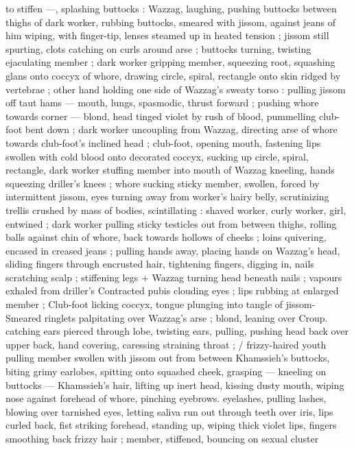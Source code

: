 to stiffen ---, splashing buttocks : Wazzag, laughing, pushing 
buttocks between thighs of dark worker, rubbing buttocks, smeared 
with jissom, against jeans of him wiping, with finger-tip, lenses 
steamed up in heated tension ; jissom still spurting, clots catching on 
curls around arse ; buttocks turning, twisting ejaculating member ; 
dark worker gripping member, squeezing root, squashing glans onto 
coccyx of whore, drawing circle, spiral, rectangle onto skin ridged by 
vertebrae ; other hand holding one side of Wazzag's sweaty torso : 
pulling jissom off taut hams --- mouth, lungs, spasmodic, thrust 
forward ; pushing whore towards corner --- blond, head tinged violet 
by rush of blood, pummelling club-foot bent down ; dark worker 
uncoupling from Wazzag, directing arse of whore towards club-foot's 
inclined head ; club-foot, opening mouth, fastening lips swollen with 
cold blood onto decorated coccyx, sucking up circle, spiral, 
rectangle, dark worker stuffing member into mouth of Wazzag 
kneeling, hands squeezing driller's knees ; whore sucking sticky 
member, swollen, forced by intermittent jissom, eyes turning away 
from worker's hairy belly, scrutinizing trellis crushed by mass of 
bodies, scintillating : shaved worker, curly worker, girl, entwined ; 
dark worker pulling sticky testicles out from between thighs, rolling 
balls against chin of whore, back towards hollows of cheeks ; loins 
quivering, encased in creased jeans ; pulling hands away, placing 
hands on Wazzag's head, sliding fingers through encrusted hair, 
tightening fingers, digging in, nails scratching scalp ; stiffening legs 
+ Wazzag turning head beneath nails ; vapours exhaled from driller's 
Contracted pubis clouding eyes ; lips rubbing at enlarged member ; 
Club-foot licking coccyx, tongue plunging into tangle of jissom- 
Smeared ringlets palpitating over Wazzag's arse ; blond, leaning over 
Croup. catching ears pierced through lobe, twisting ears, pulling, 
pushing head back over upper back, hand covering, caressing 
straining throat ; {\slash} frizzy-haired youth pulling member swollen with 
jissom out from between Khamssieh's buttocks, biting grimy 
earlobes, spitting onto squashed cheek, grasping --- kneeling on 
buttocks --- Khamssieh's hair, lifting up inert head, kissing dusty 
mouth, wiping nose against forehead of whore, pinching eyebrows. 
eyelashes, pulling lashes, blowing over tarnished eyes, letting saliva 
run out through teeth over iris, lips curled back, fist striking 
forehead, standing up, wiping thick violet lips, fingers smoothing 
back frizzy hair ; member, stiffened, bouncing on sexual cluster 
